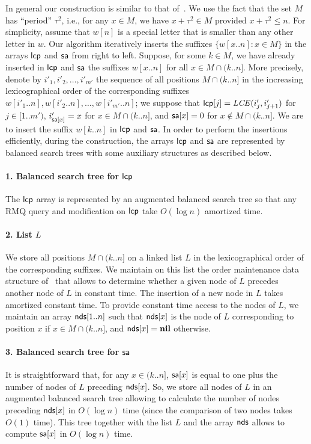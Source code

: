 \documentclass[3p,twocolumn]{elsarticle}
\theoremstyle{plain}
\theoremstyle{definition}
\newcommand{\LCE}{\mathit{LCE}}
\newcommand{\lcp}{{\sf lcp}}
\newcommand{\sa}{{\sf sa}}
\newcommand{\nodes}{{\sf nds}}
\newcommand{\nil}{\mathbf{nil}}
\begin{document}
In general our construction is similar to that of~\cite{KosolobovLempelZiv}. We use the fact that the set $M$ has ``period'' $\tau^2$, i.e., for any $x\in M$, we have $x + \tau^2 \in M$ provided $x + \tau^2 \le n$. For simplicity, assume that $w[n]$ is a special letter that is smaller than any other letter in $w$. Our algorithm iteratively inserts the suffixes $\{w[x..n] \colon x \in M\}$ in the arrays $\lcp$ and $\sa$ from right to left. Suppose, for some $k \in M$, we have already inserted in $\lcp$ and $\sa$ the suffixes $w[x..n]$ for all $x \in M \cap (k..n]$. More precisely, denote by $i'_1, i'_2, \ldots, i'_{m'}$ the sequence of all positions $M\cap (k..n]$ in the increasing lexicographical order of the corresponding suffixes $w[i'_1..n], w[i'_2..n], \ldots, w[i'_{m'}..n]$; we suppose that $\lcp[j] = \LCE(i'_j, i'_{j+1})$ for $j \in [1..m')$, $i'_{\sa[x]} = x$ for $x \in M\cap(k..n]$, and $\sa[x] = 0$ for $x\notin M\cap(k..n]$. We are to insert the suffix $w[k..n]$ in $\lcp$ and $\sa$. In order to perform the insertions efficiently, during the construction, the arrays $\lcp$ and $\sa$ are represented by balanced search trees with some auxiliary structures as described below.

\paragraph{1. Balanced search tree for $\lcp$} The $\lcp$ array is represented by an augmented balanced search tree so that any RMQ query and modification on $\lcp$ take $O(\log n)$ amortized time.

\paragraph{2. List $L$} We store all positions $M\cap (k..n]$ on a linked list $L$ in the lexicographical order of the corresponding suffixes. We maintain on this list the order maintenance data structure of~\cite{BenderColeDemaineFarachColtonZito} that allows to determine whether a given node of $L$ precedes another node of $L$ in constant time. The insertion of a new node in $L$ takes amortized constant time. To provide constant time access to the nodes of $L$, we maintain an array $\nodes[1..n]$ such that $\nodes[x]$ is the node of $L$ corresponding to position $x$ if $x \in M\cap (k..n]$, and $\nodes[x] = \nil$ otherwise.

\paragraph{3. Balanced search tree for $\sa$} It is straightforward that, for any $x \in (k..n]$, $\sa[x]$ is equal to one plus the number of nodes of $L$ preceding $\nodes[x]$. So, we store all nodes of $L$ in an augmented balanced search tree allowing to calculate the number of nodes preceding $\nodes[x]$ in $O(\log n)$ time (since the comparison of two nodes takes $O(1)$ time). This tree together with the list $L$ and the array $\nodes$ allows to compute $\sa[x]$ in $O(\log n)$ time.
\end{document}
